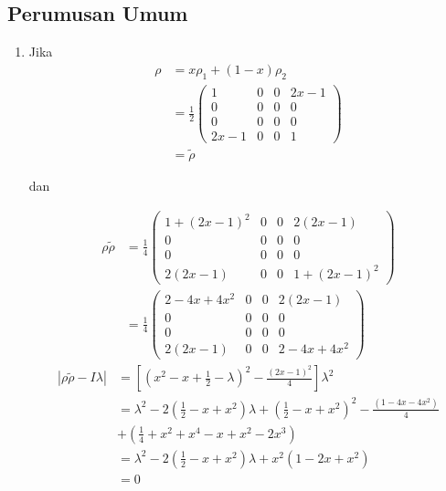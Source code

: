 \subsection{Perumusan Umum}
\begin{enumerate}
	\item Jika
	\begin{equation}
		\begin{aligned}
			\rho
			&=x\rho_1+(1-x)\rho_2\\
			&=\frac{1}{2}
			\begin{pmatrix}
				1&0&0&2x-1\\
				0&0&0&0\\
				0&0&0&0\\
				2x-1&0&0&1
			\end{pmatrix}\\
			&=\tilde{\rho}
		\end{aligned}
	\end{equation}
	
	dan
	
	\begin{equation}
		\begin{aligned}
			\rho \tilde{\rho}
			&=\frac{1}{4}
			\begin{pmatrix}
				1+(2x-1)^2&0&0&2(2x-1)\\
				0&0&0&0\\
				0&0&0&0\\
				2(2x-1)&0&0&1+(2x-1)^2
			\end{pmatrix}\\
			&=\frac{1}{4}
			\begin{pmatrix}
				2-4x+4x^2&0&0&2(2x-1)\\
				0&0&0&0\\
				0&0&0&0\\
				2(2x-1)&0&0&2-4x+4x^2
			\end{pmatrix}
		\end{aligned}
	\end{equation}
	\begin{equation}
		\begin{aligned}
			|\rho \tilde{\rho}-I\lambda|
			&=[(x^2-x+\frac{1}{2}-\lambda)^2-\frac{(2x-1)^2}{4}]\lambda^2\\
			&=\lambda^2-2(\frac{1}{2}-x+x^2)\lambda+(\frac{1}{2}-x+x^2)^2-\frac{(1-4x-4x^2)}{4}\\
			&+(\frac{1}{4}+x^2+x^4-x+x^2-2x^3)\\
			&=\lambda^2-2(\frac{1}{2}-x+x^2)\lambda+x^2(1-2x+x^2)\\
			&=0
		\end{aligned}
	\end{equation}
	

\end{enumerate}
